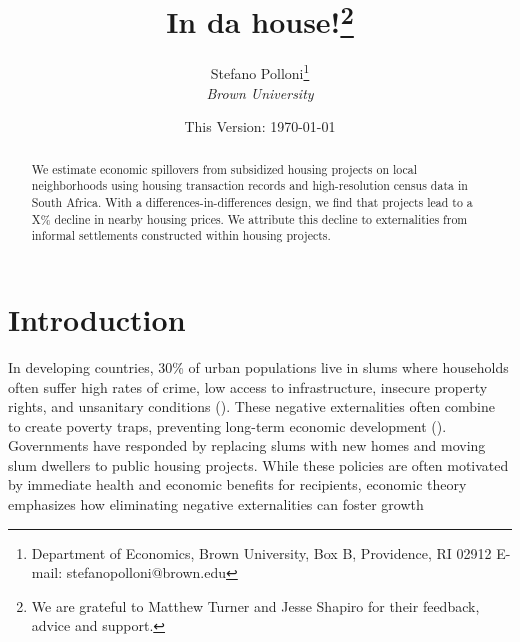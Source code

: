 \documentclass[12pt]{article}
\begin{document}
\begin{titlepage}
\title{In da house!\thanks{We are grateful to Matthew Turner and Jesse Shapiro for their feedback, advice and support.}}
\vspace{2mm}
\author{Stefano Polloni\thanks{Department of Economics, Brown University, Box B, Providence, RI 02912  E-mail: stefano\textunderscore polloni@brown.edu}\\[-0.4em] \normalsize{\it Brown University}\\}
\vspace{30mm}
\date{\vspace{5mm}This Version: \today}
\maketitle
\begin{abstract}
 We estimate economic spillovers from subsidized housing projects on local neighborhoods using housing transaction records and high-resolution census data in South Africa.  With a differences-in-differences design, we find that projects lead to a X\% decline in nearby housing prices.  We attribute this decline to externalities from informal settlements constructed within housing projects.   
\bigskip
\end{abstract}
\setcounter{page}{0}
\thispagestyle{empty}
\end{titlepage}
\pagebreak \newpage

\doublespacing

\section{Introduction} \label{sec:introduction}

In developing countries, 30\% of urban populations live in slums where households often suffer high rates of crime, low access to infrastructure, insecure property rights, and unsanitary conditions (\cite{mdg}).  These negative externalities often combine to create poverty traps, preventing long-term economic development (\cite{10.1257/jep.27.4.187}). Governments have responded by replacing slums with new homes and moving slum dwellers to public housing projects.  While these policies are often motivated by immediate health and economic benefits for recipients, economic theory emphasizes how eliminating negative externalities can foster growth
\end{document}
